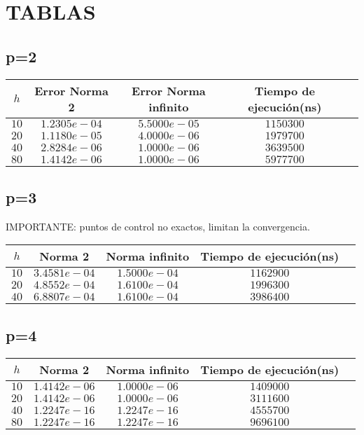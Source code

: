 \documentclass[12pt]{article}
\begin{document}
\section{TABLAS}
\subsection{p=2}

\begin{center}
\begin{tabular} {|c|c|c|c|l|}
\hline
$h$ & Error Norma 2 & Error Norma infinito & Tiempo de ejecución(ns)\\
\hline
$10$ &   $ 1.2305e-04$ & $5.5000e-05$  & $1150300$ \\
$20$ &   $1.1180e-05$   &  $4.0000e-06$ & $1979700$   \\
$40$ &   $2.8284e-06$   &  $1.0000e-06$ & $3639500$   \\
$80$ &   $1.4142e-06$   &  $1.0000e-06$ & $5977700$   \\

\hline
\end{tabular}
\vspace{3cm}
\end{center}

\subsection{p=3}
IMPORTANTE: puntos de control no exactos, limitan la convergencia.
\begin{center}
\begin{tabular} {|c|c|c|c|l|}
\hline
$h$ & Norma 2 & Norma infinito & Tiempo de ejecución(ns)\\
\hline
$10$ &   $ 3.4581e-04$ & $1.5000e-04$  & $1162900$ \\
$20$ &   $4.8552e-04$   &  $1.6100e-04$ & $1996300$   \\
$40$ &   $6.8807e-04$   &  $1.6100e-04$ & $3986400$   \\


\hline
\end{tabular}
\vspace{3cm}
\end{center}

\subsection{p=4}
\begin{center}
\begin{tabular} {|c|c|c|c|l|}
\hline
$h$ & Norma 2 & Norma infinito & Tiempo de ejecución(ns)\\
\hline
$10$ &   $ 1.4142e-06$ & $1.0000e-06$  & $1409000$ \\
$20$ &   $1.4142e-06$   &  $1.0000e-06$ & $3111600$   \\
$40$ &   $1.2247e-16$   &  $1.2247e-16$ & $4555700$   \\
$80$ &   $1.2247e-16$   &  $1.2247e-16$ & $9696100$   \\

\hline
\end{tabular}
\vspace{3cm}
\end{center}
\end{document}
